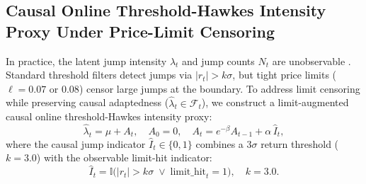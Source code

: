 \documentclass[11pt,a4paper]{article}
\begin{document}
\subsection{Causal Online Threshold-Hawkes Intensity Proxy Under Price-Limit Censoring}
In practice, the latent jump intensity $\lambda_t$ and jump counts $N_t$ are unobservable \citep{Bacry2015,Qiao2025,He2026}. Standard threshold filters detect jumps via $|r_t| > k\sigma$, but tight price limits ($\ell = 0.07$ or $0.08$) censor large jumps at the boundary. To address limit censoring while preserving causal adaptedness ($\hat{\lambda}_t \in \mathcal{F}_t$), we construct a limit-augmented causal online threshold-Hawkes intensity proxy:
\begin{equation}
  \hat{\lambda}_t = \mu + A_t, \quad A_0 = 0, \quad A_t = e^{-\beta} A_{t-1} + \alpha\,\hat{I}_t,
  \label{eq:online_filter}
\end{equation}
where the causal jump indicator $\hat{I}_t \in \{0, 1\}$ combines a $3\sigma$ return threshold ($k = 3.0$) with the observable limit-hit indicator:
\begin{equation}
  \hat{I}_t = \mathbb{I}\Big(|r_t| > k\sigma \;\lor\; \text{limit\_hit}_t = 1\Big), \quad k = 3.0.
  \label{eq:jump_detector}
\end{equation}
\end{document}
